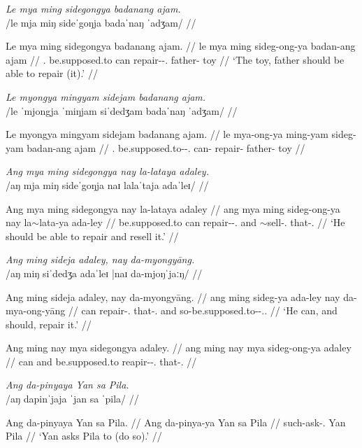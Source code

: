 \documentclass[12pt,a4paper]{scrartcl}
\newcommand{\PargI}{{\Parg}.{\Inan}}
\newcommand{\PatTI}{{\PatT}.{\Inan}}
\newcommand{\TsgM}{{\Tsg}.{\M}}
\newcommand{\til}{$\sim$} %
\begin{document}
\pex
\a\begingl
\glpreamble \textit{Le mya ming sidegongya badanang ajam.} \\
	/le mja miŋ sideˈgoŋja badaˈnaŋ ˈadʒam/ //

\gla Le mya ming sidegongya badanang ajam. //
\glb le mya ming sideg-ong-ya badan-ang ajam //
\glc \PatTI{} be.supposed.to can repair-\Irr{}-\TsgM{} father-\Aarg{} toy //
\glft `The toy, father should be able to repair (it).' //
\endgl

\a\ljudge*\begingl
\glpreamble \textit{Le myongya mingyam sidejam badanang ajam.} \\
	/le ˈmjongja ˈmiŋjam siˈdedʒam badaˈnaŋ ˈadʒam/ //

\gla Le myongya mingyam sidejam badanang ajam. //
\glb le mya-ong-ya ming-yam sideg-yam badan-ang ajam //
\glc \PatTI{} be.supposed.to-\Irr{}-\TsgM{} can-\Ptcp{} repair-\Ptcp{} father-\Aarg{} toy //
\endgl\xe

\ex\begingl
\glpreamble \textit{Ang mya ming sidegongya nay la-lataya adaley.} \\
	/aŋ mja miŋ sideˈgoŋja naɪ lalaˈtaja adaˈleɪ/ //

\gla Ang mya ming sidegongya nay la-lataya adaley //
\glb ang mya ming sideg-ong-ya nay la\til{}lata-ya ada-ley //
\glc \AgtT{} be.supposed.to can repair-\Irr{}-\TsgM{} and \Iter{}\til{}sell-\TsgM{} that-\PargI{} //
\glft `He should be able to repair and resell it.' //
\endgl\xe

\pex
\a\begingl
\glpreamble \textit{Ang ming sideja adaley, nay da-myongyāng.} \\
	/aŋ miŋ siˈdedʒa adaˈleɪ |naɪ da-mjoŋˈjaːŋ/ //

\gla Ang ming sideja adaley, nay da-myongyāng. //
\glb ang ming sideg-ya ada-ley nay da-mya-ong-yāng //
\glc \AgtT{} can repair-\TsgM{} that-\PargI{} and so-be.supposed.to-\Irr{}-\TsgM{}.\Aarg{} //
\glft `He can, and should, repair it.' //
\endgl

\a\ljudge*\begingl
\gla Ang ming nay mya sidegongya adaley. //
\glb ang ming nay mya sideg-ong-ya adaley //
\glc \AgtT{} can and be.supposed.to reapir-\Irr{}-\TsgM{} that-\PargI{} //
\endgl
\xe

\ex\begingl
\glpreamble \textit{Ang da-pinyaya Yan sa Pila.} \\
	/aŋ dapinˈjaja ˈjan sa ˈpila/ //

	\gla Ang da-pinyaya Yan sa Pila. //
	\glb Ang da-pinya-ya Yan sa Pila //
	\glc \AgtT{} such-ask-\TsgM{} Yan \Parg{} Pila //
	\glft `Yan asks Pila to (do so).' //
\endgl\xe
\end{document}

